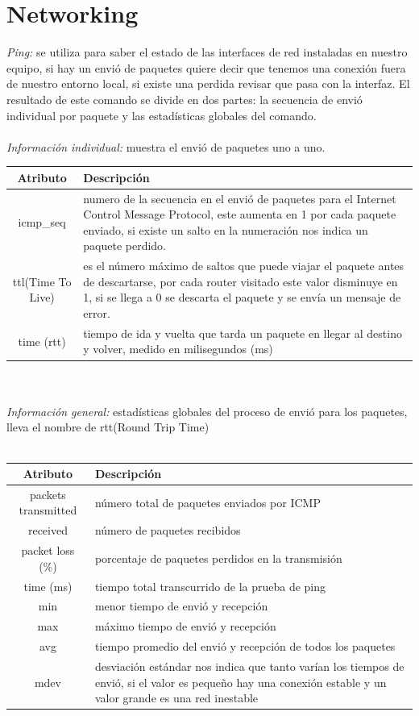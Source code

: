 \documentclass[10pt,a4paper,titlepage]{article}
\begin{document}
	
	\section*{Networking}
	\emph{Ping:} se utiliza para saber el estado de las interfaces de red instaladas en nuestro equipo, si hay un envió de paquetes quiere decir que tenemos una conexión fuera de nuestro entorno local, si existe una perdida revisar que pasa con la interfaz. El resultado de este comando se divide en dos partes: la secuencia de envió individual por paquete y las estadísticas globales del comando.
	\\
	\\
	\emph{Información individual:} muestra el envió de paquetes uno a uno.
	\\
	\begin{tabular}{|c|p{8cm}|}
		\hline
		Atributo & Descripción \\
		\hline
		icmp\_seq & numero de la secuencia en el envió de paquetes para el Internet Control Message Protocol, este aumenta en 1 por cada paquete enviado, si existe un salto en la numeración nos indica un paquete perdido. \\
		\hline
		ttl(Time To Live) & es el número máximo de saltos que puede viajar el paquete antes de descartarse, por cada router visitado este valor disminuye en 1, si se llega a 0 se descarta el paquete y se envía un mensaje de error. \\
		\hline
		time (rtt) & tiempo de ida y vuelta que tarda un paquete en llegar al destino y volver, medido en milisegundos (ms) \\
		\hline
	\end{tabular}
	\\
	\\
	\emph{Información general:} estadísticas globales del proceso de envió para los paquetes, lleva el nombre de rtt(Round Trip Time)
	\\
	\\
	\begin{tabular}{|c|p{8cm}|}
		\hline
		Atributo & Descripción \\
		\hline
		packets transmitted & número total de paquetes enviados por ICMP \\
		\hline
		received & número de paquetes recibidos \\
		\hline
		packet loss (\%) & porcentaje de paquetes perdidos en la transmisión \\
		\hline
		time (ms) & tiempo total transcurrido de la prueba de ping \\
		\hline
		min & menor tiempo de envió y recepción \\
		\hline
		max & máximo tiempo de envió y recepción \\
		\hline
		avg & tiempo promedio del envió y recepción de todos los paquetes \\
		\hline
		mdev & desviación estándar nos indica que tanto varían los tiempos de envió, si el valor es pequeño hay una conexión estable y un valor grande es una red inestable \\
		\hline
	\end{tabular}
\end{document}
